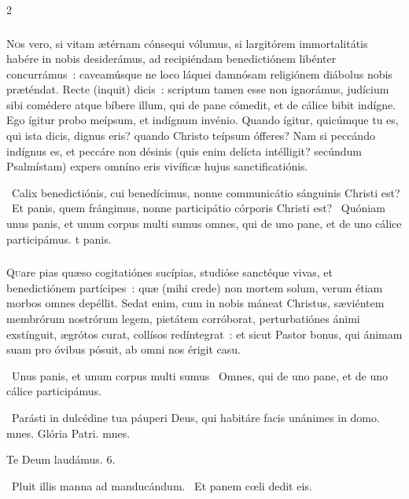 \documentclass[9pt,twoside]{extarticle}
\begin{document}
\begin{multicols}{2}
\subsubsection*{\center {}}
\lettrine{N}os vero, si vitam ætérnam cónsequi vólumus, si largitórem immortalitátis habére in nobis desiderámus, ad recipiéndam benedictiónem libénter concurrámus~: caveamúsque ne loco láquei damnósam religiónem diábolus nobis præténdat. Recte (inquit) dicis~: scriptum tamen esse non ignorámus, judícium sibi comédere atque bíbere illum, qui de pane cómedit, et de cálice bibit indígne. Ego ígitur probo meípsum, et indígnum invénio. Quando ígitur, quicúmque tu es, qui ista dicis, dignus eris? quando Christo teípsum ófferes? Nam si peccándo indígnus es, et peccáre non désinis (quis enim delícta intélligit? secúndum Psalmístam) expers omníno eris vivíficæ hujus sanctificatiónis.

\begin{tightlist}{}
\item {}~Calix benedictiónis, cui benedícimus, nonne communicátio sánguinis Christi est? \textred{*}~Et panis, quem frángimus, nonne participátio córporis Christi est? ~Quóniam unus panis, et unum corpus multi sumus omnes, qui de uno pane, et de uno cálice participámus. t panis.
\end{tightlist}

\subsubsection*{\center {}}
\lettrine{Q}uare pias quæso cogitatiónes sucípias, studióse sanctéque vivas, et benedictiónem partícipes~: quæ (mihi crede) non mortem solum, verum étiam morbos omnes depéllit. Sedat enim, cum in nobis máneat Christus, sæviéntem membrórum nostrórum legem, pietátem corróborat, perturbatiónes ánimi exstínguit, ægrótos curat, collísos redíntegrat~: et sicut Pastor bonus, qui ánimam suam pro óvibus pósuit, ab omni nos érigit casu.

\begin{tightlist}{}
\item {}~Unus panis, et unum corpus multi sumus \textred{*}~Omnes, qui de uno pane, et de uno cálice participámus. 
\item {}~Parásti in dulcédine tua páuperi Deus, qui habitáre facis unánimes in domo. mnes. Glória Patri. mnes.
\item Te Deum laudámus. 6.
\item {}~Pluit illis manna ad manducándum. ~Et panem cœli dedit eis.
\end{tightlist}


\end{multicols}
\end{document}
